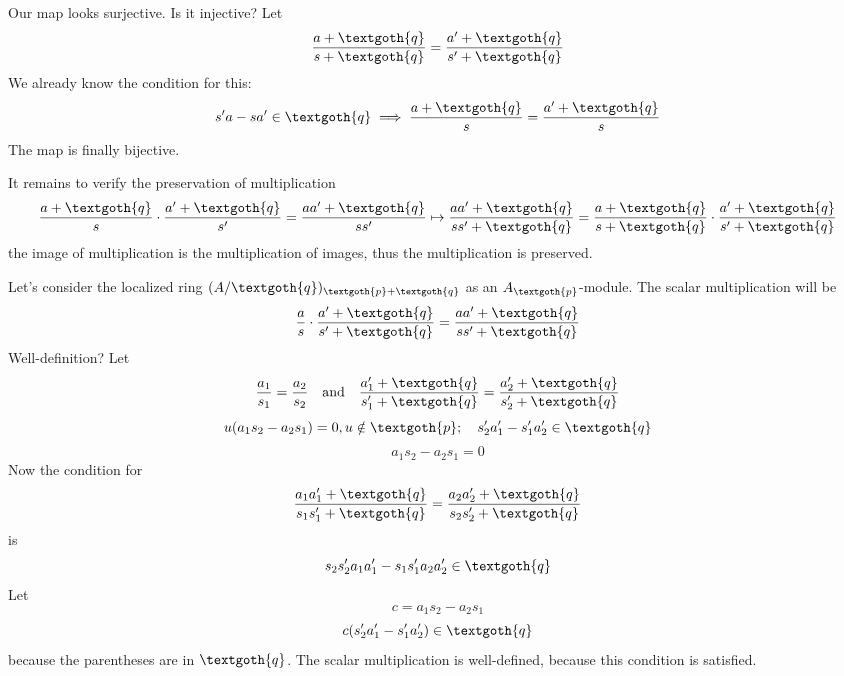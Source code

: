 \documentclass{article}
\begin{document}
Our map looks surjective. Is it injective? Let
\[
\frac{a + \textgoth{q}}{s + \textgoth{q}} = \frac{a' + \textgoth{q}}{s' + \textgoth{q}}
\]
\noindent
We already know the condition for this:
\[
s'a - sa' \in \textgoth{q} \implies \frac{a + \textgoth{q}}{s} = \frac{a' + \textgoth{q}}{s}
\]
\noindent
The map is finally bijective. 

It remains to verify the preservation of multiplication
\[
\frac{a + \textgoth{q}}{s} \cdot \frac{a' + \textgoth{q}}{s'} 
= \frac{aa' + \textgoth{q}}{ss'} \mapsto 
\frac{aa' + \textgoth{q}}{ss' + \textgoth{q}} 
= \frac{a + \textgoth{q}}{s + \textgoth{q}} \cdot \frac{a' + \textgoth{q}}{s' + \textgoth{q}}
\]
\noindent
the image of multiplication is the multiplication of images, thus the multiplication is preserved.

Let's consider the localized ring $(A/\textgoth{q})_{\textgoth{p} + \textgoth{q}}$ as an $A_\textgoth{p}$-module. The scalar multiplication will be
\[
\frac{a}{s} \cdot \frac{a' + \textgoth{q}}{s' + \textgoth{q}} = 
\frac{aa' + \textgoth{q}}{ss' + \textgoth{q}}
\]
\noindent
Well-definition? Let 
\[
\frac{a_1}{s_1} = \frac{a_2}{s_2} \quad \text{and} \quad
\frac{a'_1 + \textgoth{q}}{s'_1 + \textgoth{q}} = \frac{a'_2 + \textgoth{q}}{s'_2 + \textgoth{q}}
\]
\[
u(a_1s_2 - a_2s_1) = 0, u \notin \textgoth{p}; \quad s'_2a'_1-s'_1a'_2 \in \textgoth{q}
\]
\[
a_1s_2 - a_2s_1 = 0
\]
\noindent
Now the condition for
\[
\frac{a_1a'_1 + \textgoth{q}}{s_1s'_1 + \textgoth{q}} = \frac{a_2a'_2 + \textgoth{q}}{s_2s'_2 + \textgoth{q}}
\]
\noindent
is
\[
s_2s'_2a_1a'_1 - s_1s'_1a_2a'_2 \in \textgoth{q}
\]
\noindent
Let
\[
c = a_1s_2 - a_2s_1
\]
\[
c(s'_2a'_1 - s'_1a'_2) \in \textgoth{q}
\]
\noindent
because the parentheses are in $\textgoth{q}$. The scalar multiplication is well-defined, because this condition is satisfied.
\end{document}

